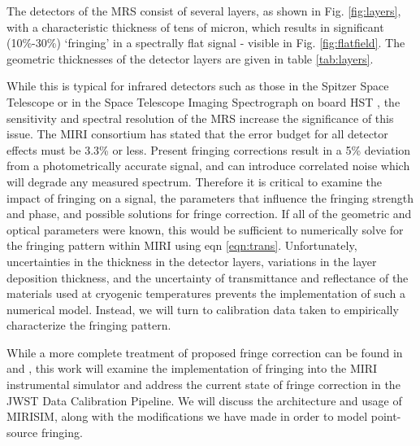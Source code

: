 The detectors of the MRS consist of several layers, as shown in Fig. \ref{fig:layers}, with a characteristic thickness of tens of micron, which results in significant (10\%-30\%) `fringing' in a spectrally flat signal - visible in Fig. \ref{fig:flatfield}.
The geometric thicknesses of the detector layers are given in table \ref{tab:layers}.

While this is typical for infrared detectors such as those in the Spitzer Space Telescope \parencite{Lahuis2003} or in the Space Telescope Imaging Spectrograph on board HST \parencite{Malumuth2003}, the sensitivity and spectral resolution of the MRS increase the significance of this issue.
The MIRI consortium has stated that the error budget for all detector effects must be 3.3\% or less. 
Present fringing corrections result in a 5\% deviation from a photometrically accurate signal, and can introduce correlated noise which will degrade any measured spectrum.
Therefore it is critical to examine the impact of fringing on a signal, the parameters that influence the fringing strength and phase, and possible solutions for fringe correction. 
If all of the geometric and optical parameters were known, this would be sufficient to numerically solve for the fringing pattern within MIRI using eqn \ref{eqn:trans}. 
Unfortunately, uncertainties in the thickness in the detector layers, variations in the layer deposition thickness, and the uncertainty of transmittance and reflectance of the materials used at cryogenic temperatures prevents the implementation of such a numerical model.
Instead, we will turn to calibration data taken to empirically characterize the fringing pattern.

While a more complete treatment of proposed fringe correction can be found in \parencite{Argyriou2020} and \parencite{Lahuis2018}, this work will examine the implementation of fringing into the MIRI instrumental simulator and address the current state of fringe correction in the JWST Data Calibration Pipeline.
We will discuss the architecture and usage of MIRISIM, along with the modifications we have made in order to model point-source fringing.

